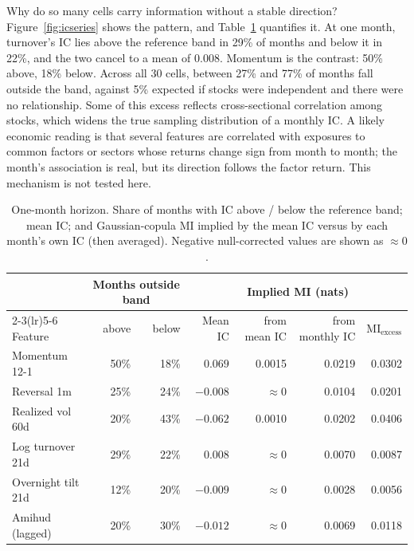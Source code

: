 \documentclass[11pt]{article}
\newcommand{\miex}{\mathrm{MI}_{\mathrm{excess}}}
\begin{document}
Why do so many cells carry information without a stable direction?
Figure~\ref{fig:icseries} shows the pattern, and Table~\ref{tab:sign} quantifies it.
At one month, turnover's IC lies above the reference band in 29\% of months and below
it in 22\%, and the two cancel to a mean of $0.008$. Momentum is the contrast: 50\%
above, 18\% below. Across all 30 cells, between 27\% and 77\% of months fall outside
the band, against 5\% expected if stocks were independent and there were no
relationship. Some of this excess reflects cross-sectional correlation among stocks,
which widens the true sampling distribution of a monthly IC. A likely economic reading
is that several features are correlated with exposures to common factors or sectors
whose returns change sign from month to month; the month's association is real, but
its direction follows the factor return. This mechanism is not tested here.

\begin{table}[t]
\centering\small
\caption{One-month horizon. Share of months with IC above / below the reference band;
mean IC; and Gaussian-copula MI implied by the mean IC versus by each month's own IC
(then averaged). Negative null-corrected values are shown as $\approx0$.}
\label{tab:sign}
\begin{tabular}{lrrrrrr}
\toprule
& \multicolumn{2}{c}{Months outside band} & & \multicolumn{2}{c}{Implied MI (nats)} & \\
\cmidrule(lr){2-3}\cmidrule(lr){5-6}
Feature & above & below & Mean IC & from mean IC & from monthly IC & $\miex$ \\
\midrule
Momentum 12-1      & 50\% & 18\% & $0.069$ & 0.0015 & 0.0219 & 0.0302 \\
Reversal 1m        & 25\% & 24\% & $-0.008$ & $\approx0$ & 0.0104 & 0.0201 \\
Realized vol 60d   & 20\% & 43\% & $-0.062$ & 0.0010 & 0.0202 & 0.0406 \\
Log turnover 21d   & 29\% & 22\% & $0.008$ & $\approx0$ & 0.0070 & 0.0087 \\
Overnight tilt 21d & 12\% & 20\% & $-0.009$ & $\approx0$ & 0.0028 & 0.0056 \\
Amihud (lagged)    & 20\% & 30\% & $-0.012$ & $\approx0$ & 0.0069 & 0.0118 \\
\bottomrule
\end{tabular}
\end{table}
\end{document}

